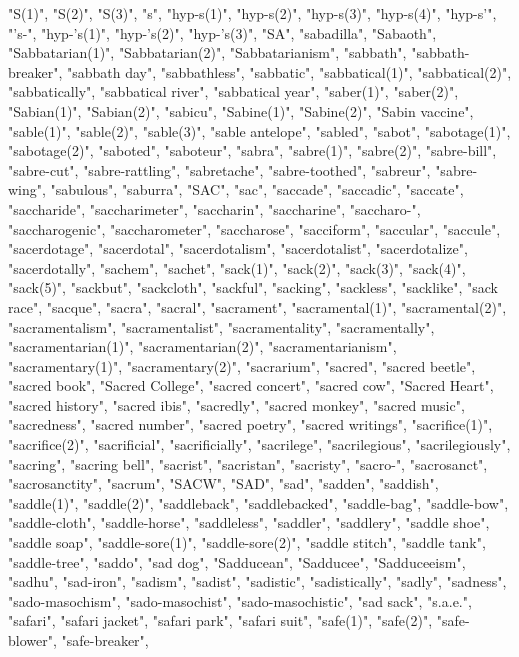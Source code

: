 "S(1)",
"S(2)",
"S(3)",
"s",
"hyp-s(1)",
"hyp-s(2)",
"hyp-s(3)",
"hyp-s(4)",
"hyp-s'",
"'s-",
"hyp-'s(1)",
"hyp-'s(2)",
"hyp-'s(3)",
"SA",
"sabadilla",
"Sabaoth",
"Sabbatarian(1)",
"Sabbatarian(2)",
"Sabbatarianism",
"sabbath",
"sabbath-breaker",
"sabbath day",
"sabbathless",
"sabbatic",
"sabbatical(1)",
"sabbatical(2)",
"sabbatically",
"sabbatical river",
"sabbatical year",
"saber(1)",
"saber(2)",
"Sabian(1)",
"Sabian(2)",
"sabicu",
"Sabine(1)",
"Sabine(2)",
"Sabin vaccine",
"sable(1)",
"sable(2)",
"sable(3)",
"sable antelope",
"sabled",
"sabot",
"sabotage(1)",
"sabotage(2)",
"saboted",
"saboteur",
"sabra",
"sabre(1)",
"sabre(2)",
"sabre-bill",
"sabre-cut",
"sabre-rattling",
"sabretache",
"sabre-toothed",
"sabreur",
"sabre-wing",
"sabulous",
"saburra",
"SAC",
"sac",
"saccade",
"saccadic",
"saccate",
"saccharide",
"saccharimeter",
"saccharin",
"saccharine",
"saccharo-",
"saccharogenic",
"saccharometer",
"saccharose",
"sacciform",
"saccular",
"saccule",
"sacerdotage",
"sacerdotal",
"sacerdotalism",
"sacerdotalist",
"sacerdotalize",
"sacerdotally",
"sachem",
"sachet",
"sack(1)",
"sack(2)",
"sack(3)",
"sack(4)",
"sack(5)",
"sackbut",
"sackcloth",
"sackful",
"sacking",
"sackless",
"sacklike",
"sack race",
"sacque",
"sacra",
"sacral",
"sacrament",
"sacramental(1)",
"sacramental(2)",
"sacramentalism",
"sacramentalist",
"sacramentality",
"sacramentally",
"sacramentarian(1)",
"sacramentarian(2)",
"sacramentarianism",
"sacramentary(1)",
"sacramentary(2)",
"sacrarium",
"sacred",
"sacred beetle",
"sacred book",
"Sacred College",
"sacred concert",
"sacred cow",
"Sacred Heart",
"sacred history",
"sacred ibis",
"sacredly",
"sacred monkey",
"sacred music",
"sacredness",
"sacred number",
"sacred poetry",
"sacred writings",
"sacrifice(1)",
"sacrifice(2)",
"sacrificial",
"sacrificially",
"sacrilege",
"sacrilegious",
"sacrilegiously",
"sacring",
"sacring bell",
"sacrist",
"sacristan",
"sacristy",
"sacro-",
"sacrosanct",
"sacrosanctity",
"sacrum",
"SACW",
"SAD",
"sad",
"sadden",
"saddish",
"saddle(1)",
"saddle(2)",
"saddleback",
"saddlebacked",
"saddle-bag",
"saddle-bow",
"saddle-cloth",
"saddle-horse",
"saddleless",
"saddler",
"saddlery",
"saddle shoe",
"saddle soap",
"saddle-sore(1)",
"saddle-sore(2)",
"saddle stitch",
"saddle tank",
"saddle-tree",
"saddo",
"sad dog",
"Sadducean",
"Sadducee",
"Sadduceeism",
"sadhu",
"sad-iron",
"sadism",
"sadist",
"sadistic",
"sadistically",
"sadly",
"sadness",
"sado-masochism",
"sado-masochist",
"sado-masochistic",
"sad sack",
"s.a.e.",
"safari",
"safari jacket",
"safari park",
"safari suit",
"safe(1)",
"safe(2)",
"safe-blower",
"safe-breaker",
